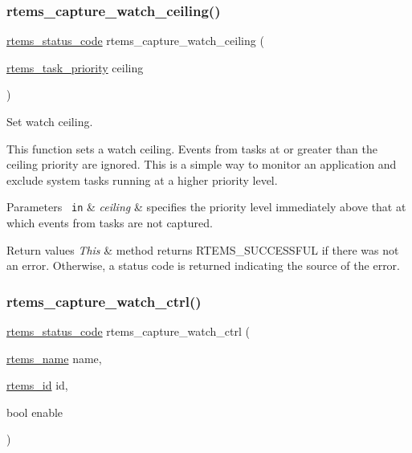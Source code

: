 \subsubsection{\texorpdfstring{rtems\_capture\_watch\_ceiling()}{rtems\_capture\_watch\_ceiling()}}
{\footnotesize\ttfamily \mbox{\hyperlink{group__ClassicStatus_ga545d41846817eaba6143d52ee4d9e9fe}{rtems\+\_\+status\+\_\+code}} rtems\+\_\+capture\+\_\+watch\+\_\+ceiling (\begin{DoxyParamCaption}\item[{\mbox{\hyperlink{group__ClassicTasks_gaa80a0c0938307d1e99d0eb5fee765b47}{rtems\+\_\+task\+\_\+priority}}}]{ceiling }\end{DoxyParamCaption})}



Set watch ceiling. 

This function sets a watch ceiling. Events from tasks at or greater than the ceiling priority are ignored. This is a simple way to monitor an application and exclude system tasks running at a higher priority level.


\begin{DoxyParams}[1]{Parameters}
\mbox{\texttt{ in}}  & {\em ceiling} & specifies the priority level immediately above that at which events from tasks are not captured.\\
\hline
\end{DoxyParams}

\begin{DoxyRetVals}{Return values}
{\em This} & method returns R\+T\+E\+M\+S\+\_\+\+S\+U\+C\+C\+E\+S\+S\+F\+UL if there was not an error. Otherwise, a status code is returned indicating the source of the error. \\
\hline
\end{DoxyRetVals}
\mbox{\label{group__libmisc__capture_gaf369469774923c9fc482937aec6ca34f}} 
\subsubsection{\texorpdfstring{rtems\_capture\_watch\_ctrl()}{rtems\_capture\_watch\_ctrl()}}
{\footnotesize\ttfamily \mbox{\hyperlink{group__ClassicStatus_ga545d41846817eaba6143d52ee4d9e9fe}{rtems\+\_\+status\+\_\+code}} rtems\+\_\+capture\+\_\+watch\+\_\+ctrl (\begin{DoxyParamCaption}\item[{\mbox{\hyperlink{group__ClassicTasks_ga55fb63c49f68c0cbd9bee004da15b1fd}{rtems\+\_\+name}}}]{name,  }\item[{\mbox{\hyperlink{group__ClassicTasks_gab20892b814dced7dd4e5b9bf42becd57}{rtems\+\_\+id}}}]{id,  }\item[{bool}]{enable }\end{DoxyParamCaption})}



